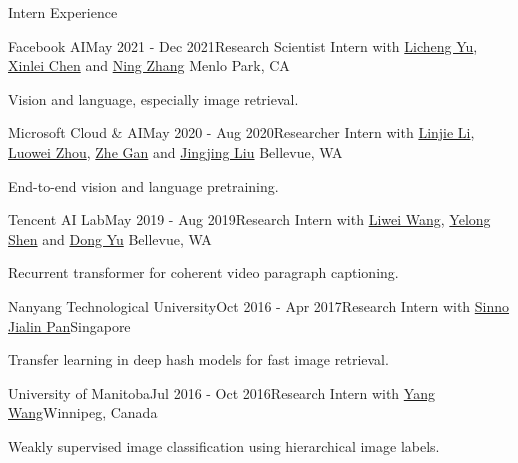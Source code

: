 \documentclass{resume} %
\begin{document}
\begin{rSection}{Intern Experience}


\begin{rSubsection}{Facebook AI}{May 2021 - Dec 2021}{Research Scientist Intern with 
    \href{https://lichengunc.github.io/}{Licheng Yu},
    \href{http://xinleic.xyz/}{Xinlei Chen} and \href{https://scholar.google.com/citations?user=DplAah0AAAAJ&hl=en}{Ning Zhang}} {Menlo Park, CA}
    \item Vision and language, especially image retrieval.
    \end{rSubsection}



\begin{rSubsection}{Microsoft Cloud \& AI}{May 2020 - Aug 2020}{Researcher Intern with 
    \href{https://scholar.google.com/citations?user=WR875gYAAAAJ&hl=en}{Linjie Li},
    \href{https://luoweizhou.github.io/}{Luowei Zhou}, \href{http://zhegan27.github.io/}{Zhe Gan} and
    \href{https://www.linkedin.com/in/jingjing-liu-65703431/}{Jingjing Liu}} {Bellevue, WA}
    \item End-to-end vision and language pretraining.
    \end{rSubsection}



\begin{rSubsection}{Tencent AI Lab}{May 2019 - Aug 2019}{Research Intern with 
    \href{http://www.deepcv.net/}{Liwei Wang}, 
    \href{https://scholar.google.com/citations?hl=en&user=S6OFEFEAAAAJ}{Yelong Shen} 
    and \href{https://scholar.google.com/citations?user=tMY31_gAAAAJ&hl=en}{Dong Yu}} {Bellevue, WA}
    \item Recurrent transformer for coherent video paragraph captioning.
    \end{rSubsection}


\begin{rSubsection}{Nanyang Technological University}{Oct 2016 - Apr 2017}{Research Intern with \href{https://personal.ntu.edu.sg/sinnopan/}{Sinno Jialin Pan}}{Singapore}
    \item Transfer learning in deep hash models for fast image retrieval.
    \end{rSubsection}


\begin{rSubsection}{University of Manitoba}{Jul 2016 - Oct 2016}{Research Intern with \href{https://www.cs.umanitoba.ca/~ywang/}{Yang Wang}}{Winnipeg, Canada}
    \item Weakly supervised image classification using hierarchical image labels.
    \end{rSubsection}

\end{rSection}
\end{document}
